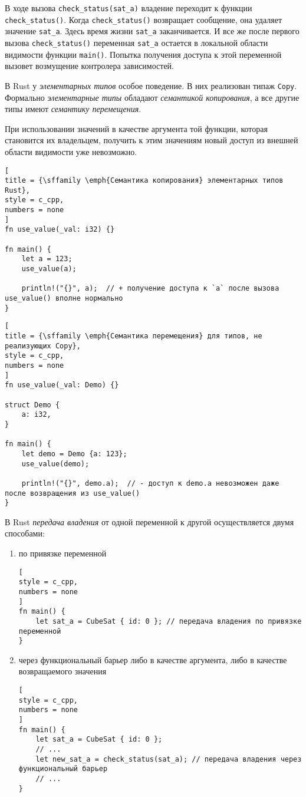 \documentclass[%
	11pt,
	a4paper,
	utf8,
		]{article}
\begin{document}
В ходе вызова \verb|check_status(sat_a)| владение переходит к функции \verb|check_status()|. Когда \verb|check_status()| возвращает сообщение, она удаляет значение \verb|sat_a|. Здесь время жизни \verb|sat_a| заканчивается. И все же после первого вызова \verb|check_status()| переменная \verb|sat_a| остается в локальной области видимости функции \verb|main()|. Попытка получения доступа к этой переменной вызовет возмущение контролера зависимостей.

В Rust у \emph{элементарных типов} особое поведение. В них реализован типаж \verb|Copy|. {\color{blue}Формально \emph{элементарные типы} обладают \emph{семантикой копирования}, а все другие типы имеют \emph{семантику перемещения}.}

{\color{red}При использовании значений в качестве аргумента той функции, которая становится их владельцем, получить к этим значениям новый доступ из внешней области видимости уже невозможно.}

\begin{lstlisting}[
title = {\sffamily \emph{Семантика копирования} элементарных типов Rust},
style = c_cpp,
numbers = none
]
fn use_value(_val: i32) {}

fn main() {
    let a = 123;
    use_value(a);
    
    println!("{}", a);  // + получение доступа к `a` после вызова use_value() вполне нормально
}
\end{lstlisting}

\begin{lstlisting}[
title = {\sffamily \emph{Семантика перемещения} для типов, не реализующих Copy},
style = c_cpp,
numbers = none
]
fn use_value(_val: Demo) {}

struct Demo {
    a: i32,
}

fn main() {
    let demo = Demo {a: 123};
    use_value(demo);
    
    println!("{}", demo.a);  // - доступ к demo.a невозможен даже после возвращения из use_value()
}
\end{lstlisting}

В Rust \emph{передача владения} от одной переменной к другой осуществляется двумя способами:
\begin{enumerate}
	\item по привязке переменной
\begin{lstlisting}[
style = c_cpp,
numbers = none
]
fn main() {
    let sat_a = CubeSat { id: 0 }; // передача владения по привязке переменной
}
\end{lstlisting}
	
	\item через функциональный барьер либо в качестве аргумента, либо в качестве возвращаемого значения
\begin{lstlisting}[
style = c_cpp,
numbers = none	
]
fn main() {
    let sat_a = CubeSat { id: 0 };
    // ...
    let new_sat_a = check_status(sat_a); // передача владения через функциональный барьер
    // ...
}
\end{lstlisting}
\end{enumerate}
\end{document}
